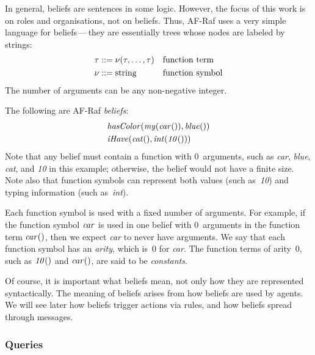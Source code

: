 \documentclass[a4paper,12pt,oneside,fleqn]{book} %
\begin{document}
In general, beliefs are sentences in some logic.  However, the focus of
this work is on roles and organisations, not on beliefs.  Thus, AF-Raf uses
a very simple language for beliefs\,---\,they are essentially trees whose
nodes are labeled by strings: \begin{align} \tau &::= \nu(\tau,\ldots,\tau)
&& \text{function term} \\ \nu  &::= {\rm string} &&\text{function symbol}
\end{align} The number of arguments can be any non-negative integer.

\begin{example}
The following are AF-Raf \emph{beliefs}:
\begin{align}
&{\it hasColor}({\it my}({\it car}()), {\it blue}()) \\
&{\it iHave}({\it cat}(), {\it int}({\it 10}()))
\end{align}
Note that any belief must contain a function with $0$~arguments, such as
{\it car}, {\it blue}, {\it cat}, and {\it 10\/} in this example;
otherwise, the belief would not have a finite size.  Note also that
function symbols can represent both values (such as~{\it 10\/}) and typing
information (such as~{\it int\/}).
\end{example}

Each function symbol is used with a fixed number of arguments.  For
example, if the function symbol ${\it car}$ is used in one belief with
$0$~arguments in the function term ${\it car}()$, then we expect {\it
car\/} to never have arguments.  We say that each function symbol has an
\emph{arity}, which is~$0$ for {\it car}.  The function terms of arity~$0$,
such as ${\it 10}()$ and ${\it car}()$, are said to be \emph{constants}.

\begin{remark}
Of course, it is important what beliefs mean, not only how they are
represented syntactically.  The meaning of beliefs arises from how beliefs
are used by agents.  We will see later how beliefs trigger actions via
rules, and how beliefs spread through messages.
\end{remark}

\subsubsection{Queries}
\end{document}
